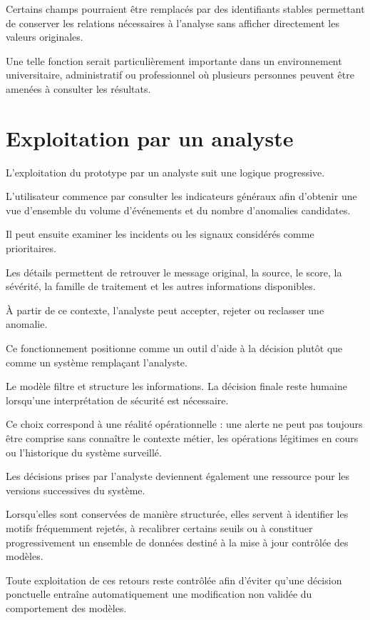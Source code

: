 Certains champs pourraient être remplacés par des identifiants stables permettant de conserver les relations nécessaires à l'analyse sans afficher directement les valeurs originales.

Une telle fonction serait particulièrement importante dans un environnement universitaire, administratif ou professionnel où plusieurs personnes peuvent être amenées à consulter les résultats.

\section{Exploitation par un analyste}

L'exploitation du prototype par un analyste suit une logique progressive.

L'utilisateur commence par consulter les indicateurs généraux afin d'obtenir une vue d'ensemble du volume d'événements et du nombre d'anomalies candidates.

Il peut ensuite examiner les incidents ou les signaux considérés comme prioritaires.

Les détails permettent de retrouver le message original, la source, le score, la sévérité, la famille de traitement et les autres informations disponibles.

À partir de ce contexte, l'analyste peut accepter, rejeter ou reclasser une anomalie.

Ce fonctionnement positionne \logminer{} comme un outil d'aide à la décision plutôt que comme un système remplaçant l'analyste.

Le modèle filtre et structure les informations. La décision finale reste humaine lorsqu'une interprétation de sécurité est nécessaire.

Ce choix correspond à une réalité opérationnelle : une alerte ne peut pas toujours être comprise sans connaître le contexte métier, les opérations légitimes en cours ou l'historique du système surveillé.

Les décisions prises par l'analyste deviennent également une ressource pour les versions successives du système.

Lorsqu'elles sont conservées de manière structurée, elles servent à identifier les motifs fréquemment rejetés, à recalibrer certains seuils ou à constituer progressivement un ensemble de données destiné à la mise à jour contrôlée des modèles.

Toute exploitation de ces retours reste contrôlée afin d'éviter qu'une décision ponctuelle entraîne automatiquement une modification non validée du comportement des modèles.

